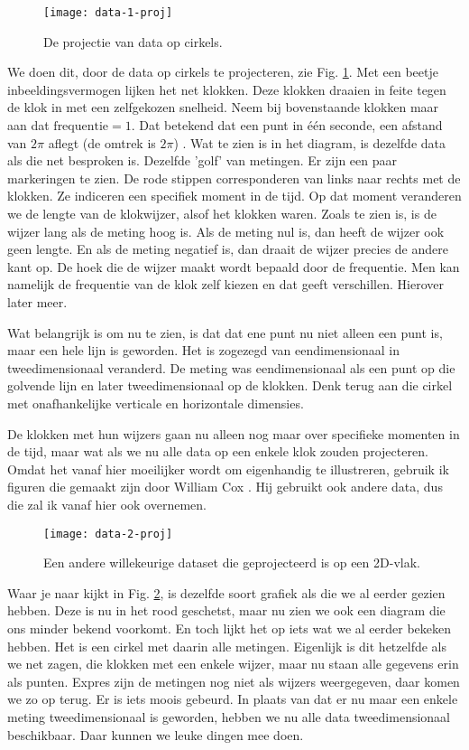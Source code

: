 \documentclass[11pt,fleqn]{book} %
\begin{document}
\begin{figure}[h]
	\centering\texttt{[image: data-1-proj]}
	\caption{De projectie van data op cirkels.}
	\label{fig:data-1-proj}
\end{figure}

We doen dit, door de data op cirkels te projecteren, zie Fig. \ref{fig:data-1-proj}. Met een beetje inbeeldingsvermogen lijken het net klokken. Deze klokken draaien in feite tegen de klok in met een zelfgekozen snelheid. Neem bij bovenstaande klokken maar aan dat $\text{frequentie}=1$. Dat betekend dat een punt in één seconde, een afstand van $2\pi$ aflegt (de omtrek is $2\pi$) . Wat te zien is in het diagram, is dezelfde data als die net besproken is. Dezelfde 'golf' van metingen. Er zijn een paar markeringen te zien. De rode stippen corresponderen van links naar rechts met de klokken. Ze indiceren een specifiek moment in de tijd. Op dat moment veranderen we de lengte van de klokwijzer, alsof het klokken waren. Zoals te zien is, is de wijzer lang als de meting hoog is. Als de meting nul is, dan heeft de wijzer ook geen lengte. En als de meting negatief is, dan draait de wijzer precies de andere kant op. De hoek die de wijzer maakt wordt bepaald door de frequentie. Men kan namelijk de frequentie van de klok zelf kiezen en dat geeft verschillen. Hierover later meer.

Wat belangrijk is om nu te zien, is dat dat ene punt nu niet alleen een punt is, maar een hele lijn is geworden. Het is zogezegd van eendimensionaal in tweedimensionaal veranderd. De meting was eendimensionaal als een punt op die golvende lijn en later tweedimensionaal op de klokken. Denk terug aan die cirkel met onafhankelijke verticale en horizontale dimensies.

De klokken met hun wijzers gaan nu alleen nog maar over specifieke momenten in de tijd, maar wat als we nu alle data op een enkele klok zouden projecteren. Omdat het vanaf hier moeilijker wordt om eigenhandig te illustreren, gebruik ik figuren die gemaakt zijn door William Cox \cite{cox}. Hij gebruikt ook andere data, dus die zal ik vanaf hier ook overnemen.

\begin{figure}[h]
	\centering\texttt{[image: data-2-proj]}
	\caption{Een andere willekeurige dataset die geprojecteerd is op een 2D-vlak.}
	\label{fig:data-2-proj}
\end{figure}

Waar je naar kijkt in Fig. \ref{fig:data-2-proj}, is dezelfde soort grafiek als die we al eerder gezien hebben. Deze is nu in het rood geschetst, maar nu zien we ook een diagram die ons minder bekend voorkomt. En toch lijkt het op iets wat we al eerder bekeken hebben. Het is een cirkel met daarin alle metingen. Eigenlijk is dit hetzelfde als we net zagen, die klokken met een enkele wijzer, maar nu staan alle gegevens erin als punten. Expres zijn de metingen nog niet als wijzers weergegeven, daar komen we zo op terug. Er is iets moois gebeurd. In plaats van dat er nu maar een enkele meting tweedimensionaal is geworden, hebben we nu alle data tweedimensionaal beschikbaar. Daar kunnen we leuke dingen mee doen.
\end{document}

